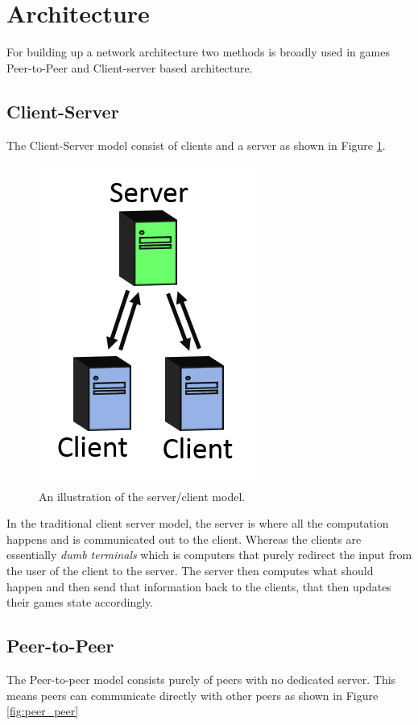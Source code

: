 \section{Architecture}
For building up a network architecture two methods is broadly used in games Peer-to-Peer and Client-server based architecture. 


\subsection{Client-Server}
The Client-Server model consist of clients and a server as shown in Figure \ref{fig:server_client}. 

\begin{figure}[H]
\centering
\includegraphics[scale=1]{figures/network/server_client}
\caption{An illustration of the server/client model.}
\label{fig:server_client}
\end{figure}

In the traditional client server model, the server is where all the computation happens and is communicated out to the client.
Whereas the clients are essentially \textit{dumb terminals} which is computers that purely redirect the input from the user of the client to the server. 
The server then computes what should happen and then send that information back to the clients, that then updates their games state accordingly.

\subsection{Peer-to-Peer}
The Peer-to-peer model consists purely of peers with no dedicated server.
This means peers can communicate directly with other peers as shown in Figure \ref{fig:peer_peer}

